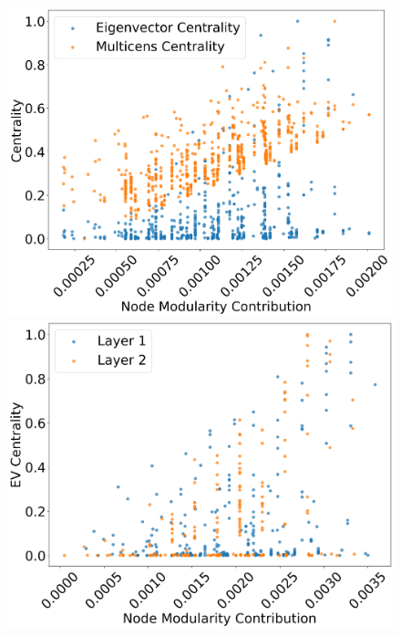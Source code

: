 \documentclass[10pt,letterpaper]{article}
\begin{document}
\begin{figure}[h!]
	\centering
	\begin{minipage}[b]{0.25\linewidth}
		\centering
		\includegraphics[width=\textwidth]{figs/fig1.png}
		\subcaption{}
	\end{minipage}
	\hspace{0.5cm}
	\begin{minipage}[b]{0.25\linewidth}
		\centering
		\includegraphics[width=\textwidth]{figs/fig2.png}
		\subcaption{}
	\end{minipage}
	\hspace{0.5cm}
	\begin{minipage}[b]{0.25\linewidth}

\end{minipage}
\end{figure}
\end{document}
